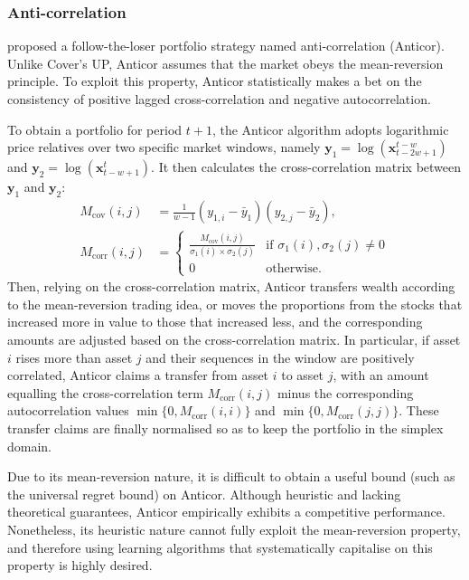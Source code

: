 \subsubsection{Anti-correlation}

\citet{borodin04} proposed a follow-the-loser portfolio strategy named anti-correlation (Anticor). Unlike Cover's UP, Anticor assumes that the market obeys the mean-reversion principle. To exploit this property, Anticor statistically makes a bet on the consistency of positive lagged cross-correlation and negative autocorrelation.

To obtain a portfolio for period $t+1$, the Anticor algorithm adopts logarithmic price relatives \citep{hull08} over two specific market windows, namely $\mathbf{y}_1 = \log(\mathbf{x}_{t-2w+1}^{t-w})$ and $\mathbf{y}_2 = \log(\mathbf{x}_{t-w+1}^{t})$. It then calculates the cross-correlation matrix between $\mathbf{y}_1$ and $\mathbf{y}_2$:
\begin{align}
	M_{\mathrm{cov}}(i, j) &= \frac{1}{w-1}(y_{1,i}-\bar{y}_1)(y_{2,j}-\bar{y}_2),
	\\
	M_{\mathrm{corr}}(i, j) &=
	\begin{cases}
		\frac{M_{\mathrm{cov}}(i, j)}{\sigma_{1}(i) \times \sigma_{2}(j)} & \text{if } \sigma_{1}(i), \sigma_{2}(j) \neq 0 \\
		0 & \text{otherwise}.
	\end{cases}
\end{align}
Then, relying on the cross-correlation matrix, Anticor transfers wealth according to the mean-reversion trading idea, or moves the proportions from the stocks that increased more in value to those that increased less, and the corresponding amounts are adjusted based on the cross-correlation matrix. In particular, if asset $i$ rises more than asset $j$ and their sequences in the window are positively correlated, Anticor claims a transfer from asset $i$ to asset $j$, with an amount equalling the cross-correlation term $M_{\mathrm{corr}}(i, j)$ minus the corresponding autocorrelation values $\min\{0, M_{\mathrm{corr}}(i, i)\}$ and $\min\{0, M_{\mathrm{corr}}(j, j)\}$. These transfer claims are finally normalised so as to keep the portfolio in the simplex domain.

Due to its mean-reversion nature, it is difficult to obtain a useful bound (such as the universal regret bound) on Anticor. Although heuristic and lacking theoretical guarantees, Anticor empirically exhibits a competitive performance. Nonetheless, its heuristic nature cannot fully exploit the mean-reversion property, and therefore using learning algorithms that systematically capitalise on this property is highly desired.

